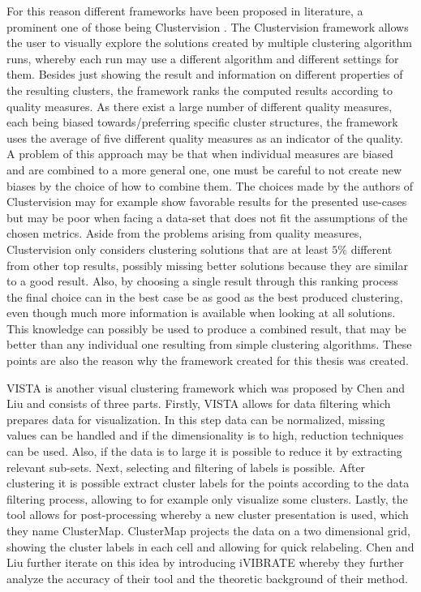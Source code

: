 \documentclass[
	a4paper,
	english,
	twoside,
	openright,               
	11pt                            
	]{report}
\begin{document}
For this reason different frameworks have been proposed in literature, a prominent one of those being Clustervision \cite{Kwon2018ClustervisionVS}. The Clustervision framework allows the user to visually explore the solutions created by multiple clustering algorithm runs, whereby each run may use a different algorithm and different settings for them. Besides just showing the result and information on different properties of the resulting clusters, the framework ranks the computed results according to quality measures. As there exist a large number of different quality measures, each being biased towards/preferring specific cluster structures, the framework uses the average of five different quality measures as an indicator of the quality. A problem of this approach may be that when individual measures are biased and are combined to a more general one, one must be careful to not create new biases by the choice of how to combine them. The choices made by the authors of Clustervision \cite{Kwon2018ClustervisionVS} may for example show favorable results for the presented use-cases but may be poor when facing a data-set that does not fit the assumptions of the chosen metrics. Aside from the problems arising from quality measures, Clustervision only considers clustering solutions that are at least $5\%$ different from other top results, possibly missing better solutions because they are similar to a good result. Also, by choosing a single result through this ranking process the final choice can in the best case be as good as the best produced clustering, even though much more information is available when looking at all solutions. This knowledge can possibly be used to produce a combined result, that may be better than any individual one resulting from simple clustering algorithms. These points are also the reason why the framework created for this thesis was created.

VISTA \cite{VISTA} is another visual clustering framework which was proposed by Chen and Liu and consists of three parts. Firstly, VISTA allows for data filtering which prepares data for visualization. In this step data can be normalized, missing values can be handled and if the dimensionality is to high, reduction techniques can be used. Also, if the data is to large it is possible to reduce it by extracting relevant sub-sets. Next, selecting and filtering of labels is possible. After clustering it is possible extract cluster labels for the points according to the data filtering process, allowing to for example only visualize some clusters. Lastly, the tool allows for post-processing whereby a new cluster presentation is used, which they name ClusterMap. ClusterMap projects the data on a two dimensional grid, showing the cluster labels in each cell and allowing for quick relabeling. Chen and Liu further iterate on this idea by introducing iVIBRATE \cite{10.1145/1148020.1148024} whereby they further analyze the accuracy of their tool and the theoretic background of their method.
\end{document}
